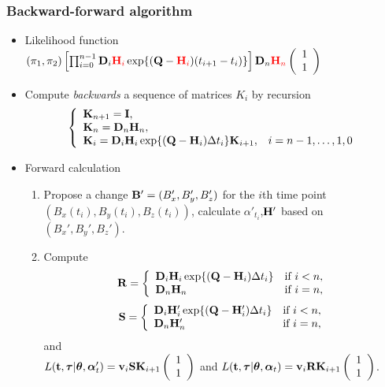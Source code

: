 \documentclass[11pt]{beamer}
\newcommand{\bit}{\begin{itemize}\setlength{\itemsep}{0cm}\setlength{\topsep}{0cm}}
\newcommand{\eit}{\end{itemize}}
\newcommand{\benum}{\begin{enumerate}\setlength{\itemsep}{0cm}\setlength{\parsep
}{0cm}}
\newcommand{\eenum}{\end{enumerate}}
\newcommand{\bB}{{\bf B}}
\newcommand{\bv}{{\bf v}}
\newcommand{\bQ}{{\bf Q}}
\newcommand{\bK}{{\bf K}}
\newcommand{\bI}{{\bf I}}
\newcommand{\bS}{{\bf S}}
\newcommand{\balpha}{\boldsymbol{\alpha}}
\newcommand{\bR}{{\bf R}}
\newcommand{\bH}{{\bf H}}
\newcommand{\bD}{{\bf D}}
\newcommand{\btheta}{{\boldsymbol{\theta}}}
\newcommand{\btau}{{\boldsymbol{\tau}}}
\newcommand{\bt}{{\bf t}}
\begin{document}
\begin{frame}
\frametitle{Backward-forward algorithm}
\bit
\item Likelihood function  $(\pi_1,\pi_2)\left[\prod_{i=0}^{n-1}\bD_i{\color{red}\bH_i}\exp\{(\bQ-{\color{red}\bH_i})(t_{i+1}- t_i)\}\right]\bD_{n}{\color{red}\bH_{n}}\left(\begin{array}{c}
1\\
1
\end{array}\right)$	
\item 	Compute {\it backwards} a sequence of matrices $K_i$ by recursion
		\begin{align*}
		\left\{
	\begin{array}{ll}
			\bK_{n+1}=\bI, \\ 
			\bK_n=\bD_n\bH_n,\\
			\bK_i=\bD_i\bH_i\exp\{(\bQ-\bH_i)\Delta t_i\}\bK_{i+1}, & i=n-1,\ldots,1,0
		\end{array}
		\right.		
	\end{align*}
\eit
\end{frame}

\begin{frame}
\bit
\item Forward calculation
\benum
\item Propose a change $\bB'=(B_x',B_y',B_z')$ for the $i$th time point $(B_x(t_i),B_y(t_i),B_z(t_i))$, calculate $\alpha'_{t_i}$,$\bH'$ based on $(B_x',B_y',B_z')$.
\item Compute 
			$$\bR=\left\{\begin{array}{ll}
				\bD_i\bH_i\exp\{(\bQ-\bH_i)\Delta t_i\}& \mbox{if } i<n, \\
				\bD_n\bH_n & \mbox{if } i=n,
			\end{array}
			\right.$$
			$$\bS=\left\{\begin{array}{ll}
				\bD_i\bH'_i\exp\{(\bQ-\bH'_i)\Delta t_i\}& \mbox{if } i<n, \\
				\bD_n\bH'_n & \mbox{if } i=n,
			\end{array}
		\right.$$
	and\\
				$L(\bt,\btau|\btheta,\balpha'_t)=\bv_i\bS \bK_{i+1}\left(\begin{array}{c}
						1\\
						1
						\end{array}\right)$ and $L(\bt,\btau|\btheta,\balpha_t)=\bv_i\bR  \bK_{i+1}\left(\begin{array}{c}
						1\\
						1
						\end{array}\right)$.		
\eenum
\eit
\end{frame}
\end{document}
